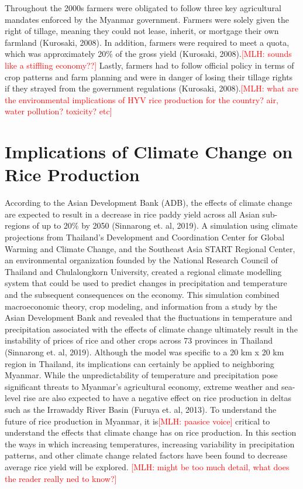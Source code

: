\documentclass{book}\usepackage{knitr}
\newcommand{\red}[1]{\textcolor{red}{[MLH: #1]}}
\begin{document}
{	Throughout the 2000s farmers were obligated to follow three key agricultural mandates enforced by the Myanmar government. Farmers were solely given the right of tillage, meaning they could not lease, inherit, or mortgage their own farmland (Kurosaki, 2008). In addition, farmers were required to meet a quota, which was approximately 20\% of the gross yield (Kurosaki, 2008).\red{sounds like a stiffling economy??} Lastly, farmers had to follow official policy in terms of crop patterns and farm planning and were in danger of losing their tillage rights if they strayed from the government regulations (Kurosaki, 2008).\red{what are the environmental implications of HYV rice production for the country? air, water pollution? toxicity? etc}
	
\section{Implications of Climate Change on Rice Production}

According to the Asian Development Bank (ADB), the effects of climate change are expected to result in a decrease in rice paddy yield across all Asian sub-regions of up to 20\% by 2050 (Sinnarong et. al, 2019). A simulation using climate projections from Thailand’s Development and Coordination Center for Global Warming and Climate Change, and the Southeast Asia START Regional Center, an environmental organization founded by the National Research Council of Thailand and Chulalongkorn University, created a regional climate modelling system that could be used to predict changes in precipitation and temperature and the subsequent consequences on the economy. This simulation combined macroeconomic theory, crop modeling, and information from a study by the Asian Development Bank and revealed that the fluctuations in temperature and precipitation associated with the effects of climate change ultimately result in the instability of prices of rice and other crops across 73 provinces in Thailand (Sinnarong et. al, 2019). Although the model was specific to a 20 km x 20 km region in Thailand, its implications can certainly be applied to neighboring Myanmar. While the unpredictability of temperature and precipitation pose significant threats to Myanmar’s agricultural economy, extreme weather and sea-level rise are also expected to have a negative effect on rice production in deltas such as the Irrawaddy River Basin (Furuya et. al, 2013). To understand the future of rice production in Myanmar, it is\red{paasice voice} critical to understand the effects that climate change has on rice production. In this section the ways in which increasing temperatures, increasing variability in precipitation patterns, and other climate change related factors have been found to decrease average rice yield will be explored.
\red{might be too much detail, what does the reader really ned to know?}

}
\end{document}
